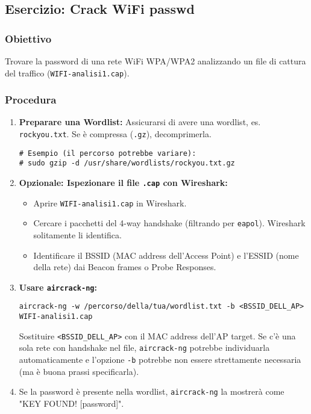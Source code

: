 \subsection{Esercizio: Crack WiFi passwd}
\subsubsection{Obiettivo}
Trovare la password di una rete WiFi WPA/WPA2 analizzando un file di cattura del traffico (\texttt{WIFI-analisi1.cap}).

\subsubsection{Procedura}
\begin{enumerate}
    \item \textbf{Preparare una Wordlist:}
    Assicurarsi di avere una wordlist, es. \texttt{rockyou.txt}. Se è compressa (\texttt{.gz}), decomprimerla.
    \begin{verbatim}
# Esempio (il percorso potrebbe variare):
# sudo gzip -d /usr/share/wordlists/rockyou.txt.gz
    \end{verbatim}
    \item \textbf{Opzionale: Ispezionare il file \texttt{.cap} con Wireshark:}
    \begin{itemize}
        \item Aprire \texttt{WIFI-analisi1.cap} in Wireshark.
        \item Cercare i pacchetti del 4-way handshake (filtrando per \texttt{eapol}). Wireshark solitamente li identifica.
        \item Identificare il BSSID (MAC address dell'Access Point) e l'ESSID (nome della rete) dai Beacon frames o Probe Responses.
    \end{itemize}
    \item \textbf{Usare \texttt{aircrack-ng}:}
    \begin{verbatim}
aircrack-ng -w /percorso/della/tua/wordlist.txt -b <BSSID_DELL_AP> WIFI-analisi1.cap
    \end{verbatim}
    Sostituire \texttt{<BSSID\_DELL\_AP>} con il MAC address dell'AP target. Se c'è una sola rete con handshake nel file, \texttt{aircrack-ng} potrebbe individuarla automaticamente e l'opzione \texttt{-b} potrebbe non essere strettamente necessaria (ma è buona prassi specificarla).
    \item Se la password è presente nella wordlist, \texttt{aircrack-ng} la mostrerà come "KEY FOUND! [password]".
\end{enumerate}

